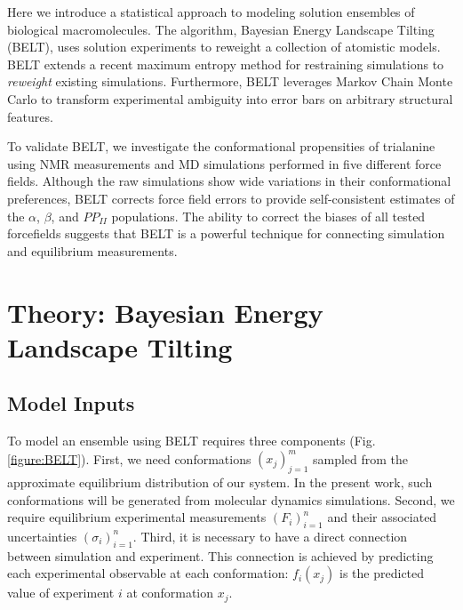 \documentclass[journal=jacsat,manuscript=article]{achemso}
\begin{document}
Here we introduce a statistical approach to modeling solution ensembles of biological macromolecules.  The algorithm, Bayesian Energy Landscape Tilting (BELT), uses solution experiments to reweight a collection of atomistic models.  BELT extends a recent maximum entropy method for restraining simulations \cite{chodera2012} to \emph{reweight} existing simulations.  Furthermore, BELT leverages Markov Chain Monte Carlo to transform experimental ambiguity into error bars on arbitrary structural features.  

To validate BELT, we investigate the conformational propensities of trialanine using NMR measurements \cite{Graf2007} and MD simulations performed in five different force fields.  Although the raw simulations show wide variations in their conformational preferences, BELT corrects force field errors to provide self-consistent estimates of the $\alpha$, $\beta$, and $PP_{II}$ populations.  The ability to correct the biases of all tested forcefields suggests that BELT is a powerful technique for connecting simulation and equilibrium measurements.  

\section{Theory: Bayesian Energy Landscape Tilting}

\subsection{Model Inputs}

To model an ensemble using BELT requires three components (Fig. \ref{figure:BELT}).  First, we need conformations $(x_j)_{j=1}^{m}$ sampled from the approximate equilibrium distribution of our system.  In the present work, such conformations will be generated from molecular dynamics simulations.  Second, we require equilibrium experimental measurements $(F_i)_{i=1}^n$ and their associated uncertainties $(\sigma_i)_{i=1}^{n}$.  Third, it is necessary to have a direct connection between simulation and experiment.  This connection is achieved by predicting each experimental observable at each conformation: $f_i(x_j)$ is the predicted value of experiment $i$ at conformation $x_j$.  
\end{document}
